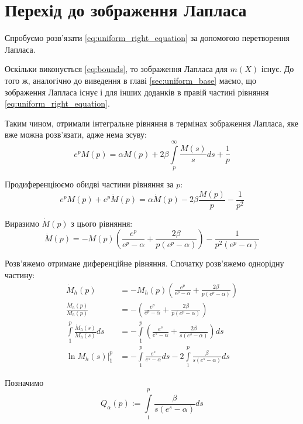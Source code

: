 \section{Перехід до зображення Лапласа}
\label{sec:uniform_right_integral_laplace}

Спробуємо розв'язати \eqref{eq:uniform_right_equation} за допомогою перетворення Лапласа.

Оскільки виконується \eqref{eq:bounds}, то зображення Лапласа для $m(X)$ існує. До того ж, аналогічно до виведення в главі \ref{sec:uniform_base} маємо, що зображення Лапласа існує і для інших доданків в правій частині рівняння \eqref{eq:uniform_right_equation}.

Таким чином, отримали інтегральне рівняння в термінах зображення Лапласа, яке вже можна розв'язати, адже нема зсуву:
\begin{equation}
	\label{eq:uniform_right_laplace_integral}
	e^p M(p) = \alpha M(p) + 2\beta \int\limits_p^\infty \frac{M(s)}{s} ds + \frac{1}{p}
\end{equation}

Продиференціюємо обидві частини рівняння за $p$:
\begin{equation}
	e^p M(p) + e^p \dot M(p) =\alpha \dot M(p) - 2 \beta \frac{M(p)}{p}  - \frac1{p^2}
\end{equation}

Виразимо $\dot M(p)$ з цього рівняння:
\begin{equation}
	\label{eq:uniform_right_laplace_diff}
	\dot M(p) = - M(p)\left(\frac{e^p}{e^p - \alpha} + \frac{2\beta}{p(e^p - \alpha)}\right) - \frac{1}{p^2(e^p - \alpha)}
\end{equation}

Розв'яжемо отримане диференційне рівняння. Спочатку розв'яжемо однорідну частину:
\begin{align*}
	\dot M_h (p) &= - M_h (p)\left(\frac{e^p}{e^p - \alpha} + \frac{2\beta}{p(e^p - \alpha)}\right) \\
	\frac{\dot M_h (p)}{M_h (p)} &= -\left(\frac{e^p}{e^p - \alpha} + \frac{2\beta}{p(e^p - \alpha)}\right) \\
	\int\limits_1^p \frac{\dot M_h (s)}{M_h (s)} ds &= -\int\limits_1^p \left(\frac{e^s}{e^s - \alpha} + \frac{2\beta}{s(e^s - \alpha)}\right) ds \\
	\left. \ln{M_h (s)}\right|_1^p &= - \int\limits_1^p \frac{e^s}{e^s - \alpha} ds  - 2 \int\limits_1^p \frac{\beta}{s(e^s - \alpha)} ds
\end{align*}

Позначимо
\begin{equation}
	\label{eq:almost_li_alpha}
	Q_\alpha(p) := \int\limits_1^p \frac{\beta}{s(e^s - \alpha)} ds
\end{equation}

